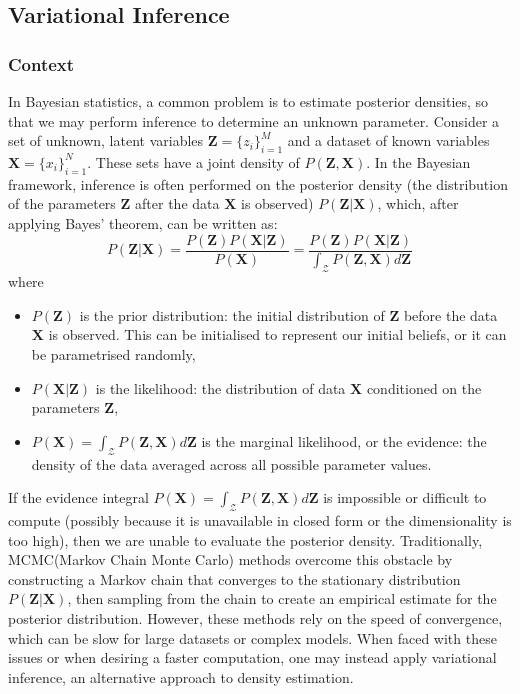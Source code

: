 \documentclass[a4paper,12pt]{article}
\numberwithin{equation}{section}
\begin{document}
\subsection{Variational Inference}
\subsubsection{Context}
In Bayesian statistics, a common problem is to estimate posterior densities, so that we may perform inference to determine an unknown parameter. Consider a set of unknown, latent variables $\textbf{Z}=\{z_i\}^M_{i=1}$ and a dataset of known variables $\textbf{X}=\{x_i\}^N_{i=1}$. These sets have a joint density of $P(\textbf{Z},\textbf{X})$. In the Bayesian framework, inference is often performed on the posterior density (the distribution of the parameters $\textbf{Z}$ after the data $\textbf{X}$ is observed)
$P(\textbf{Z}|\textbf{X})$, which, after applying Bayes' theorem, can be written as:
\begin{equation*}P(\textbf{Z}|\textbf{X})=\frac{P(\textbf{Z})P(\textbf{X}|\textbf{Z})}{P(\textbf{X})}= \frac{P(\textbf{Z})P(\textbf{X}|\textbf{Z})}{\int_\mathcal{Z}P(\textbf{Z},\textbf{X})d\textbf{Z}}\end{equation*}
where
\begin{itemize}
\item $P(\textbf{Z})$ is the prior distribution: the initial distribution of $\textbf{Z}$ before the data $\textbf{X}$ is observed. This can be initialised to represent our initial beliefs, or it can be parametrised randomly,
\item $P(\textbf{X}|\textbf{Z})$ is the likelihood: the distribution of data $\textbf{X}$ conditioned on the parameters $\textbf{Z}$,
\item $P(\textbf{X})=\int_\mathcal{Z}P(\textbf{Z},\textbf{X})d\textbf{Z}$ is the marginal likelihood, or the evidence: the density of the data averaged across all possible parameter values.
\end{itemize}
If the evidence integral $P(\textbf{X})=\int_\mathcal{Z}P(\textbf{Z},\textbf{X})d\textbf{Z}$ is impossible or difficult to compute (possibly because it is unavailable in closed form or the dimensionality is too high), then we are unable to evaluate the posterior density. Traditionally, MCMC(Markov Chain Monte Carlo) methods overcome this obstacle by constructing a Markov chain that converges to the stationary distribution $P(\textbf{Z}|\textbf{X})$, then sampling from the chain to create an empirical estimate for the posterior distribution. However, these methods rely on the speed of convergence, which can be slow for large datasets or complex models. When faced with these issues or when desiring a faster computation, one may instead apply variational inference, an alternative approach to density estimation.
\end{document}

